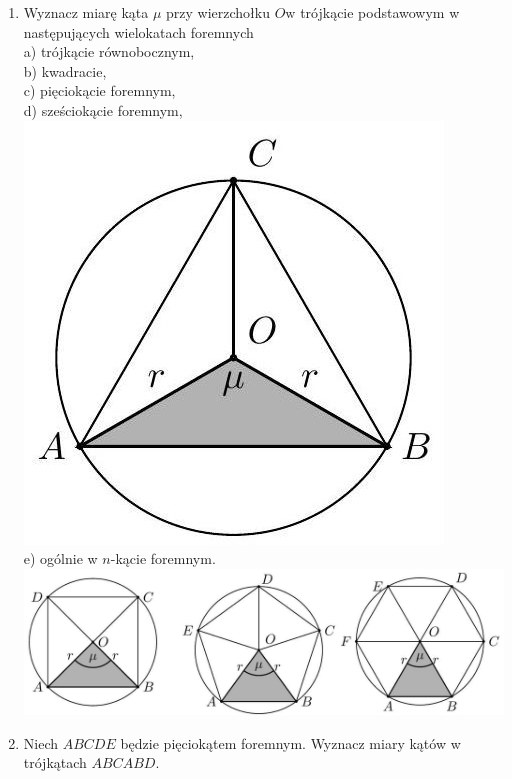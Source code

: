 \documentclass[10pt]{article}
\begin{document}
\begin{enumerate}
  \item Wyznacz miarę kąta \(\mu\) przy wierzchołku \(O \mathrm{w}\) trójkącie podstawowym w następujących wielokatach foremnych\\
a) trójkącie równobocznym,\\
b) kwadracie,\\
c) pięciokącie foremnym,\\
d) sześciokącie foremnym,\\
\includegraphics[max width=\textwidth, center]{2024_11_21_e9b4faa005d5be2cc318g-056(1)}\\
e) ogólnie w \(n\)-kącie foremnym.\\
\includegraphics[max width=\textwidth, center]{2024_11_21_e9b4faa005d5be2cc318g-056(2)}
  \item Niech \(A B C D E\) będzie pięciokątem foremnym. Wyznacz miary kątów w trójkątach \(A B C A B D\).

\end{enumerate}
\end{document}
